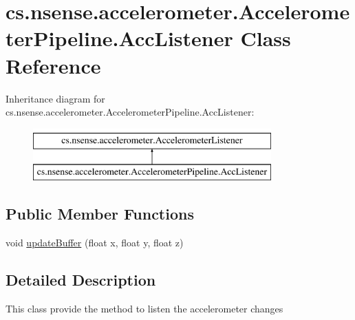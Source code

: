 \hypertarget{classcs_1_1nsense_1_1accelerometer_1_1_accelerometer_pipeline_1_1_acc_listener}{\section{cs.\-nsense.\-accelerometer.\-Accelerometer\-Pipeline.\-Acc\-Listener Class Reference}
\label{classcs_1_1nsense_1_1accelerometer_1_1_accelerometer_pipeline_1_1_acc_listener}
}
Inheritance diagram for cs.\-nsense.\-accelerometer.\-Accelerometer\-Pipeline.\-Acc\-Listener\-:\begin{figure}[H]
\begin{center}
\leavevmode
\includegraphics[height=2.000000cm]{classcs_1_1nsense_1_1accelerometer_1_1_accelerometer_pipeline_1_1_acc_listener}
\end{center}
\end{figure}
\subsection*{Public Member Functions}
\begin{DoxyCompactItemize}
\item 
void \hyperlink{classcs_1_1nsense_1_1accelerometer_1_1_accelerometer_pipeline_1_1_acc_listener_a9efa0a736cc4a91fcc0b839bc5e12041}{update\-Buffer} (float x, float y, float z)
\end{DoxyCompactItemize}


\subsection{Detailed Description}
This class provide the method to listen the accelerometer changes 

